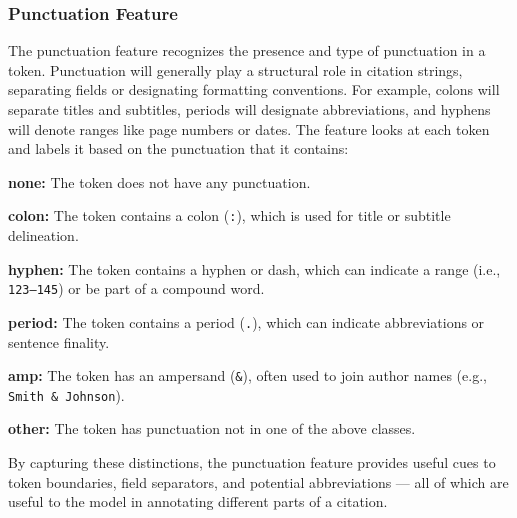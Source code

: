 \subsubsection{Punctuation Feature}
The punctuation feature recognizes the presence and type of punctuation in a token. Punctuation will generally play a structural role in citation strings, separating fields or designating formatting conventions. For example, colons will separate titles and subtitles, periods will designate abbreviations, and hyphens will denote ranges like page numbers or dates.
The feature looks at each token and labels it based on the punctuation that it contains:
\begin{compactitem}
\item \textbf{none:} The token does not have any punctuation.
\item \textbf{colon:} The token contains a colon (\texttt{:}), which is used for title or subtitle delineation.
\item \textbf{hyphen:} The token contains a hyphen or dash, which can indicate a range (i.e., \texttt{123–145}) or be part of a compound word.
\item \textbf{period:} The token contains a period (\texttt{.}), which can indicate abbreviations or sentence finality.
\item \textbf{amp:} The token has an ampersand (\texttt{\&}), often used to join author names (e.g., \texttt{Smith \& Johnson}).
\item \textbf{other:} The token has punctuation not in one of the above classes.
\end{compactitem}
By capturing these distinctions, the punctuation feature provides useful cues to token boundaries, field separators, and potential abbreviations — all of which are useful to the model in annotating different parts of a citation.


